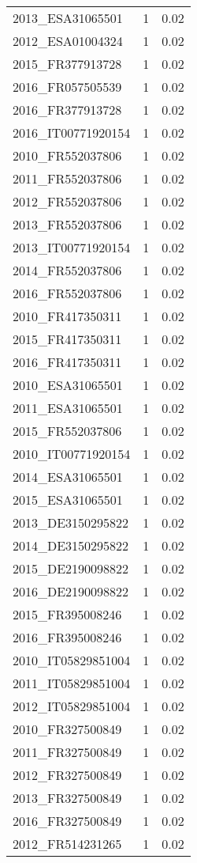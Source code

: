 \begin{table*}[htbp]
\begin{tabular}{lrr}
2013_ESA31065501 & 1 & 0.02 \\
2012_ESA01004324 & 1 & 0.02 \\
2015_FR377913728 & 1 & 0.02 \\
2016_FR057505539 & 1 & 0.02 \\
2016_FR377913728 & 1 & 0.02 \\
2016_IT00771920154 & 1 & 0.02 \\
2010_FR552037806 & 1 & 0.02 \\
2011_FR552037806 & 1 & 0.02 \\
2012_FR552037806 & 1 & 0.02 \\
2013_FR552037806 & 1 & 0.02 \\
2013_IT00771920154 & 1 & 0.02 \\
2014_FR552037806 & 1 & 0.02 \\
2016_FR552037806 & 1 & 0.02 \\
2010_FR417350311 & 1 & 0.02 \\
2015_FR417350311 & 1 & 0.02 \\
2016_FR417350311 & 1 & 0.02 \\
2010_ESA31065501 & 1 & 0.02 \\
2011_ESA31065501 & 1 & 0.02 \\
2015_FR552037806 & 1 & 0.02 \\
2010_IT00771920154 & 1 & 0.02 \\
2014_ESA31065501 & 1 & 0.02 \\
2015_ESA31065501 & 1 & 0.02 \\
2013_DE3150295822 & 1 & 0.02 \\
2014_DE3150295822 & 1 & 0.02 \\
2015_DE2190098822 & 1 & 0.02 \\
2016_DE2190098822 & 1 & 0.02 \\
2015_FR395008246 & 1 & 0.02 \\
2016_FR395008246 & 1 & 0.02 \\
2010_IT05829851004 & 1 & 0.02 \\
2011_IT05829851004 & 1 & 0.02 \\
2012_IT05829851004 & 1 & 0.02 \\
2010_FR327500849 & 1 & 0.02 \\
2011_FR327500849 & 1 & 0.02 \\
2012_FR327500849 & 1 & 0.02 \\
2013_FR327500849 & 1 & 0.02 \\
2016_FR327500849 & 1 & 0.02 \\
2012_FR514231265 & 1 & 0.02 \\

\end{tabular}
\end{table*}
